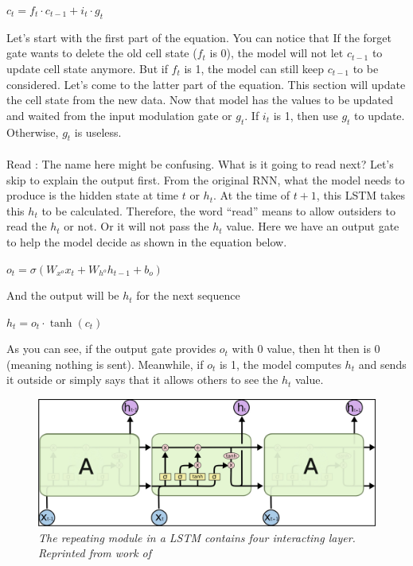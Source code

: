 \hfil $c_t = f_t \cdot c_{t-1} + i_t \cdot g_t $ \par 
Let's start with the first part of the equation. You can notice that If the forget gate wants to delete the old cell state ($f_t$ is 0), the model will not let $c_{t -1}$ to update cell state anymore. But if $f_t$ is 1, the model can still keep $c_{t -1}$ to be considered. Let’s come to the latter part of the equation. This section will update the cell state from the new data. Now that model has the values to be updated and waited from the input modulation gate or $g_t$. If $i_t$ is 1, then use $g_t$ to update. Otherwise, $g_t$ is useless.

\paragraph{}
Read : The name here might be confusing. What is it going to read next? Let's skip to explain the output first. From the original RNN, what the model needs to produce is the hidden state at time $t$ or $h_t$. At the time of $t+1$, this LSTM takes this $h_t$ to be calculated. Therefore, the word “read” means to allow outsiders to read the $h_t$ or not. Or it will not pass the $h_t$ value. Here we have an output gate to help the model decide as shown in the equation below. 

\hfil $ o_t = \sigma(W_{x^o}x_t + W_{h^o}h_{t-1} + b_o) $ \par 
And the output will be $h_t$ for the next sequence

\hfil $ h_t = o_t \cdot \tanh(c_t) $ \par 
As you can see, if the output gate provides $o_t$ with 0 value, then ht then is 0 (meaning nothing is sent). Meanwhile, if $o_t$ is 1, the model computes $h_t$ and sends it outside or simply says that it allows others to see the $h_t$ value.

\begin{figure}[H]
  \centering
  \caption[The repeating module in a LSTM contains four interacting layer.]{\emph{The repeating module in a LSTM contains four interacting layer. \\Reprinted from work of \citeauthor{sirinart_tangruamsub_2017} \citeyear{sirinart_tangruamsub_2017}}}\label{fig:LSTM_2}
  \includegraphics[scale = 0.2]{figures/LSTM_2.jpg}  

\end{figure}

